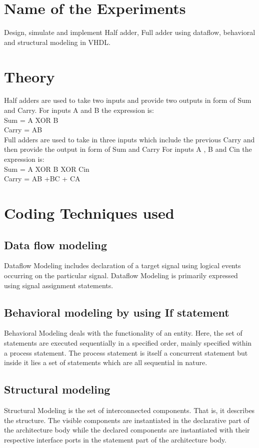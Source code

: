 \section{Name of the Experiments}
 Design, simulate and implement Half adder, Full adder using dataflow, behavioral and structural modeling in VHDL.
 

\section{Theory}



Half adders are used to take two inputs and provide two outputs in form of Sum and Carry.
For inputs A  and B the expression is:\\
Sum = A XOR B\\
Carry = AB\\

Full adders are used to take in three inputs which include the previous Carry and then provide the output in form of Sum and Carry
For inputs A , B and Cin the expression is:\\
Sum = A XOR B XOR Cin\\
Carry = AB +BC + CA 


\section{Coding Techniques used}
\subsection{Data flow modeling}

Dataflow Modeling includes declaration of a target signal using logical events occurring on the particular signal. Dataflow Modeling is primarily expressed using signal assignment statements.

\subsection{ Behavioral modeling by using If statement}
Behavioral Modeling deals with the functionality of an entity. Here, the set of statements are executed sequentially in a specified order, mainly specified within a process statement. The process statement is itself a concurrent statement but inside it lies a set of statements which are all sequential in nature.

\subsection{Structural modeling }
Structural Modeling is the set of interconnected components. That is, it describes the structure. The visible components are instantiated in the declarative part of the architecture body while the declared components are instantiated with their respective interface ports in the statement part of the architecture body.

